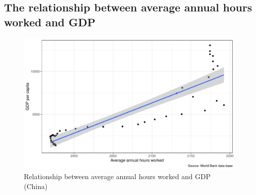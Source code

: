 \documentclass[11pt,a4paper,]{article}
\begin{document}
\hypertarget{the-relationship-between-average-annual-hours-worked-and-gdp}{%
\subsection{The relationship between average annual hours worked and GDP}\label{the-relationship-between-average-annual-hours-worked-and-gdp}}

\begin{Shaded}
\begin{Highlighting}[]
\SpecialCharTok{\%\textgreater{}\%}
    \SpecialCharTok{==}\NormalTok{)}\SpecialCharTok{\%\textgreater{}\%}
    \NormalTok{(} \NormalTok{(}
                          \SpecialCharTok{+}
    \NormalTok{() }\SpecialCharTok{+} 
    \NormalTok{(}\SpecialCharTok{+}
  \NormalTok{(}\NormalTok{, }
       \NormalTok{, }
        \NormalTok{)}\SpecialCharTok{+}
    \NormalTok{()}
\end{Highlighting}
\end{Shaded}

\begin{figure}
\centering
\includegraphics{report_files/figure-latex/Figure3-1.pdf}
\caption{\label{fig:Figure3}Relationship between average annual hours worked and GDP (China)}
\end{figure}
\end{document}
